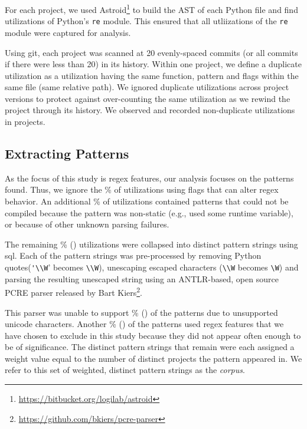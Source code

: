 For each project, we used Astroid\footnote{\url{https://bitbucket.org/logilab/astroid}} to build the AST of each Python file and find utilizations of Python's {\tt re} module. This ensured that all utliizations of the {\tt re} module were captured for analysis.

Using git, each project was scanned at 20 evenly-spaced commits (or all commits if there were less than 20) in its history.
Within one project, we define a duplicate utilization as a utilization having the same function, pattern and flags within the same file (same relative path).  We ignored duplicate utilizations across project versions to protect against over-counting the same utilization as we rewind the project through its history.  We observed and recorded  non-duplicate utilizations in  projects.

\subsection{Extracting Patterns}
As the focus of this study is regex features, our analysis focuses on the patterns found. Thus,  we ignore the \%  of utilizations using flags that can alter regex behavior.  An additional \% of utilizations contained patterns that could not be compiled because the pattern was non-static (e.g., used some runtime variable), or because of other unknown parsing failures.

The remaining \% () utilizations were collapsed into  distinct pattern strings using sql.  Each of the pattern strings was pre-processed by removing Python quotes(\verb!'\\W!' becomes \verb!\\W!), unescaping escaped characters (\verb!\\W! becomes \verb!\W!) and parsing the resulting unescaped string using an ANTLR-based, open source PCRE parser released by Bart Kiers\footnote{\url{https://github.com/bkiers/pcre-parser}}.

This parser was unable to support \% () of the patterns due to unsupported unicode characters.  Another \% () of the patterns used regex features that we have chosen to exclude in this study because they did not appear often enough to be of significance.  The  distinct pattern strings that remain were each assigned a weight value equal to the number of distinct projects the pattern appeared in.  We  refer to this set of weighted, distinct pattern strings as the \emph{corpus}.

